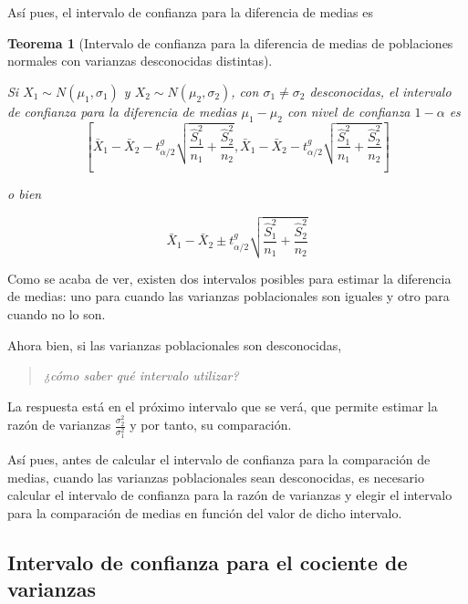 \documentclass[
  spanish,
  a4paper,
]{scrreport}
\theoremstyle{plain}
\newtheorem{theorem}{Teorema}[chapter]
\theoremstyle{definition}
\theoremstyle{definition}
\theoremstyle{remark}
\begin{document}
Así pues, el intervalo de confianza para la diferencia de medias es

\begin{theorem}[Intervalo de confianza para la diferencia de medias de
poblaciones normales con varianzas desconocidas
distintas]\protect\hypertarget{thm-intervalo-confianza-diferencia-medias-normales-varianzas-desconocidas-iguales}{}\label{thm-intervalo-confianza-diferencia-medias-normales-varianzas-desconocidas-iguales}

Si \(X_1\sim N(\mu_1,\sigma_1)\) y \(X_2\sim N(\mu_2,\sigma_2)\), con
\(\sigma_1 \neq \sigma_2\) desconocidas, el \emph{intervalo de confianza
para la diferencia de medias} \(\mu_1-\mu_2\) con nivel de confianza
\(1-\alpha\) es \[
\left[\bar{X}_1-\bar{X}_2-t^{g}_{\alpha/2}\sqrt{\frac{\hat{S}^2_1}{n_1}+\frac{\hat{S}^2_2}{n_2}},\bar{X}_1-\bar{X}_2-t^{g}_{\alpha/2}\sqrt{\frac{\hat{S}^2_1}{n_1}+\frac{\hat{S}^2_2}{n_2}}\right]
\]

o bien

\[
\bar{X}_1-\bar{X}_2\pm t^{g}_{\alpha/2}\sqrt{\frac{\hat{S}^2_1}{n_1}+\frac{\hat{S}^2_2}{n_2}}
\]

\end{theorem}

Como se acaba de ver, existen dos intervalos posibles para estimar la
diferencia de medias: uno para cuando las varianzas poblacionales son
iguales y otro para cuando no lo son.

Ahora bien, si las varianzas poblacionales son desconocidas,

\begin{quote}
\emph{¿cómo saber qué intervalo utilizar?}
\end{quote}

La respuesta está en el próximo intervalo que se verá, que permite
estimar la razón de varianzas \(\frac{\sigma_2^2}{\sigma_1^2}\) y por
tanto, su comparación.

Así pues, antes de calcular el intervalo de confianza para la
comparación de medias, cuando las varianzas poblacionales sean
desconocidas, es necesario calcular el intervalo de confianza para la
razón de varianzas y elegir el intervalo para la comparación de medias
en función del valor de dicho intervalo.

\subsection{Intervalo de confianza para el cociente de
varianzas}\label{intervalo-de-confianza-para-el-cociente-de-varianzas}
\end{document}
